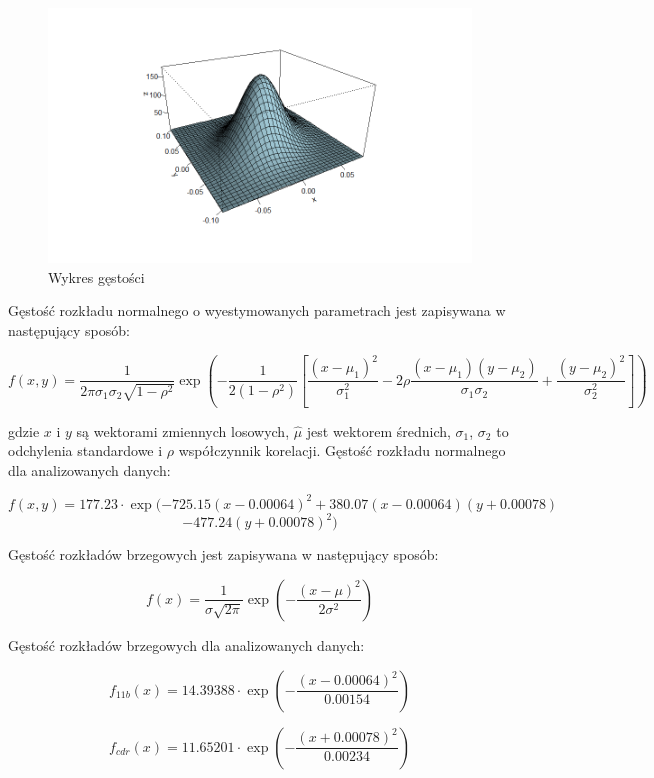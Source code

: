 \documentclass[a4paper,11pt]{article}
\def\\{\hfill\break}
\begin{document}
\begin{figure}[H]
    \includegraphics[width=12cm]{Wykresy/Wykres_gestosci.png}
    \caption{Wykres gęstości}
    \label{Wykres_gestosci}
\end{figure}

\newpage

Gęstość rozkładu normalnego o wyestymowanych parametrach  jest zapisywana w następujący sposób:


$$f(x, y) = \frac{1}{2\pi\sigma_1\sigma_2\sqrt{1 - \rho^2}} \exp\left(-\frac{1}{2(1 - \rho^2)}\left[\frac{(x - \mu_1)^2}{\sigma_1^2} - 2\rho\frac{(x - \mu_1)(y - \mu_2)}{\sigma_1\sigma_2} + \frac{(y - \mu_2)^2}{\sigma_2^2}\right]\right)$$

gdzie $x$ i $y$ są wektorami zmiennych losowych, $\hat{\mu}$ jest wektorem średnich, $\sigma_1$, $\sigma_2$ to odchylenia standardowe i $\rho$ współczynnik korelacji.\\
\\
Gęstość rozkładu normalnego dla analizowanych danych:

$$f(x, y) = 177.23\cdot\exp(-725.15(x-0.00064)^2 + 380.07(x-0.00064)(y+0.00078)$$
$$-477.24(y + 0.00078)^2)$$


\\
Gęstość rozkładów brzegowych jest zapisywana w następujący sposób:


$$f(x) = \frac{1}{\sigma\sqrt{2\pi}}\exp\left(-\frac{(x-\mu)^2}{2\sigma^2}\right)$$

\\

Gęstość rozkładów brzegowych dla analizowanych danych:


$$f_{11b}(x) = 14.39388\cdot\exp\left(-\frac{(x-0.00064)^2}{0.00154}\right)$$


$$f_{cdr}(x) = 11.65201\cdot\exp\left(-\frac{(x+0.00078)^2}{0.00234}\right)$$
\end{document}
